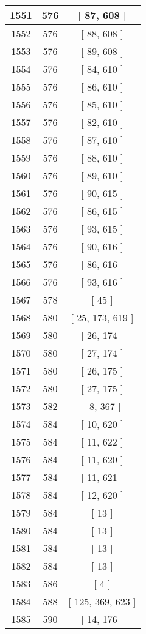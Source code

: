 \begin{center}
\begin{longtable}[H]{|| c c c ||}
\hline
1551 & 576 & [ 87, 608 ] \\ 
\hline
1552 & 576 & [ 88, 608 ] \\ 
\hline
1553 & 576 & [ 89, 608 ] \\ 
\hline
1554 & 576 & [ 84, 610 ] \\ 
\hline
1555 & 576 & [ 86, 610 ] \\ 
\hline
1556 & 576 & [ 85, 610 ] \\ 
\hline
1557 & 576 & [ 82, 610 ] \\ 
\hline
1558 & 576 & [ 87, 610 ] \\ 
\hline
1559 & 576 & [ 88, 610 ] \\ 
\hline
1560 & 576 & [ 89, 610 ] \\ 
\hline
1561 & 576 & [ 90, 615 ] \\ 
\hline
1562 & 576 & [ 86, 615 ] \\ 
\hline
1563 & 576 & [ 93, 615 ] \\ 
\hline
1564 & 576 & [ 90, 616 ] \\ 
\hline
1565 & 576 & [ 86, 616 ] \\ 
\hline
1566 & 576 & [ 93, 616 ] \\ 
\hline
1567 & 578 & [ 45 ] \\ 
\hline
1568 & 580 & [ 25, 173, 619 ] \\ 
\hline
1569 & 580 & [ 26, 174 ] \\ 
\hline
1570 & 580 & [ 27, 174 ] \\ 
\hline
1571 & 580 & [ 26, 175 ] \\ 
\hline
1572 & 580 & [ 27, 175 ] \\ 
\hline
1573 & 582 & [ 8, 367 ] \\ 
\hline
1574 & 584 & [ 10, 620 ] \\ 
\hline
1575 & 584 & [ 11, 622 ] \\ 
\hline
1576 & 584 & [ 11, 620 ] \\ 
\hline
1577 & 584 & [ 11, 621 ] \\ 
\hline
1578 & 584 & [ 12, 620 ] \\ 
\hline
1579 & 584 & [ 13 ] \\ 
\hline
1580 & 584 & [ 13 ] \\ 
\hline
1581 & 584 & [ 13 ] \\ 
\hline
1582 & 584 & [ 13 ] \\ 
\hline
1583 & 586 & [ 4 ] \\ 
\hline
1584 & 588 & [ 125, 369, 623 ] \\ 
\hline
1585 & 590 & [ 14, 176 ] \\ 

\end{longtable}
\end{center}

